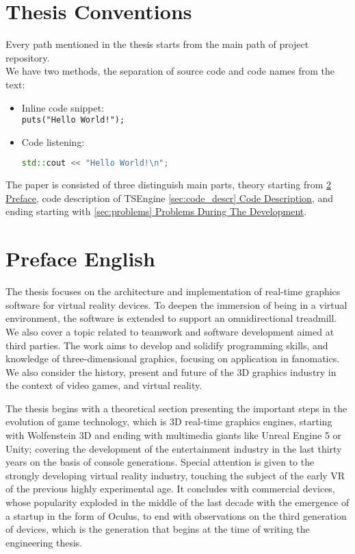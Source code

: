 \newpage
\section{Thesis Conventions}
Every path mentioned in the thesis starts from the main path of project repository.\\
We have two methods, the separation of source code and code names from the text:
\begin{itemize}
    \item Inline code snippet:\\
    \texttt{puts("Hello World!");}
    \item Code listening:
\begin{lstlisting}[language=c++, caption=Example code snippet (./example\_dir/example\_file.cpp)]
std::cout << "Hello World!\n";
\end{lstlisting}
\end{itemize}
The paper is consisted of three distinguish main parts, theory starting from \hyperref[sec:preface]{\ref*{sec:preface} Preface}, code description of TSEngine \hyperref[sec:code_descr]{\ref*{sec:code_descr} Code Description}, and ending starting with \hyperref[sec:problems]{\ref*{sec:problems} Problems During The Development}.

\newpage
\section{Preface English} %
\label{sec:preface}
The thesis focuses on the architecture and implementation of real-time graphics software for virtual reality devices. To deepen the immersion of being in a virtual environment, the software is extended to support an omnidirectional treadmill. We also cover a topic related to teamwork and software development aimed at third parties. The work aims to develop and solidify programming skills, and knowledge of three-dimensional graphics, focusing on application in fanomatics. We also consider the history, present and future of the 3D graphics industry in the context of video games, and virtual reality.

The thesis begins with a theoretical section presenting the important steps in the evolution of game technology, which is 3D real-time graphics engines, starting with Wolfenstein 3D and ending with multimedia giants like Unreal Engine 5 or Unity; covering the development of the entertainment industry in the last thirty years on the basis of console generations. Special attention is given to the strongly developing virtual reality industry, touching the subject of the early VR of the previous highly experimental age. It concludes with commercial devices, whose popularity exploded in the middle of the last decade with the emergence of a startup in the form of Oculus, to end with observations on the third generation of devices, which is the generation that begins at the time of writing the engineering thesis.

